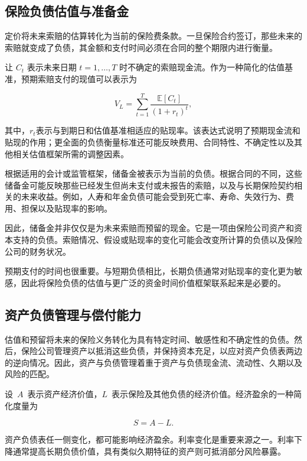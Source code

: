 \subsection{保险负债估值与准备金}

定价将未来索赔的估算转化为当前的保险费条款。一旦保险合约签订，那些未来的索赔就变成了负债，其金额和支付时间必须在合同的整个期限内进行衡量。

让 $C_t$ 表示未来日期 $t=1,\ldots,T$ 时不确定的索赔现金流。作为一种简化的估值基准，预期索赔支付的现值可以表示为

\begin{equation}
V_L=\sum_{t=1}^{T}
\frac{\mathbb{E}[C_t]}{(1+r_t)^t},
\label{eq:ch15-insurance-liability-pv}
\end{equation}

其中，$r_t$表示与到期日和估值基准相适应的贴现率。该表达式说明了预期现金流和贴现的作用；更全面的负债衡量标准还可能反映费用、合同特性、不确定性以及其他相关估值框架所需的调整因素。

根据适用的会计或监管框架，储备金被表示为当前的负债。根据合同的不同，这些储备金可能反映那些已经发生但尚未支付或未报告的索赔，以及与长期保险契约相关的未来收益。例如，人寿和年金负债可能会受到死亡率、寿命、失效行为、费用、担保以及贴现率的影响。

因此，储备金并非仅仅是为未来索赔而预留的现金。它是一项由保险公司资产和资本支持的负债。索赔情况、假设或贴现率的变化可能会改变所计算的负债以及保险公司的财务状况。

预期支付的时间也很重要。与短期负债相比，长期负债通常对贴现率的变化更为敏感，因此将保险负债的估值与更广泛的资金时间价值框架联系起来是必要的。



\subsection{资产负债管理与偿付能力}

估值和预留将未来的保险义务转化为具有特定时间、敏感性和不确定性的负债。然后，保险公司管理资产以抵消这些负债，并保持资本充足，以应对资产负债表两边的逆向情况。因此，资产与负债管理着重于资产与负债现金流、流动性、久期以及风险的匹配。

设~$A$~表示资产经济价值，$L$~表示保险及其他负债的经济价值。经济盈余的一种简化度量为

\begin{equation}
S=A-L.
\label{eq:ch15-economic-surplus}
\end{equation}

资产负债表任一侧变化，都可能影响经济盈余。利率变化是重要来源之一。利率下降通常提高长期负债价值，具有类似久期特征的资产则可抵消部分风险暴露。

